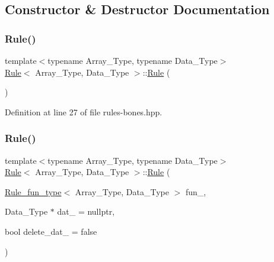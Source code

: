 \subsection{Constructor \& Destructor Documentation}
\mbox{\label{class_rule_aef92e54d53dc77b5cad2f819b5f8f4bf}} 
\subsubsection{\texorpdfstring{Rule()}{Rule()}\hspace{0.1cm}{\footnotesize\ttfamily [1/2]}}
{\footnotesize\ttfamily template$<$typename Array\+\_\+\+Type, typename Data\+\_\+\+Type$>$ \\
\hyperlink{class_rule}{Rule}$<$ Array\+\_\+\+Type, Data\+\_\+\+Type $>$\+::\hyperlink{class_rule}{Rule} (\begin{DoxyParamCaption}{ }\end{DoxyParamCaption})\hspace{0.3cm}{\ttfamily [inline]}}



Definition at line 27 of file rules-\/bones.\+hpp.

\mbox{\label{class_rule_ad0b81db664bed03f9a381f90ab617424}} 
\subsubsection{\texorpdfstring{Rule()}{Rule()}\hspace{0.1cm}{\footnotesize\ttfamily [2/2]}}
{\footnotesize\ttfamily template$<$typename Array\+\_\+\+Type, typename Data\+\_\+\+Type$>$ \\
\hyperlink{class_rule}{Rule}$<$ Array\+\_\+\+Type, Data\+\_\+\+Type $>$\+::\hyperlink{class_rule}{Rule} (\begin{DoxyParamCaption}\item[{\hyperlink{typedefs_8hpp_a2e147c9c0e8b65be614c98a5dd400d5c}{Rule\+\_\+fun\+\_\+type}$<$ Array\+\_\+\+Type, Data\+\_\+\+Type $>$}]{fun\+\_\+,  }\item[{Data\+\_\+\+Type $\ast$}]{dat\+\_\+ = {\ttfamily nullptr},  }\item[{bool}]{delete\+\_\+dat\+\_\+ = {\ttfamily false} }\end{DoxyParamCaption})\hspace{0.3cm}{\ttfamily [inline]}}



